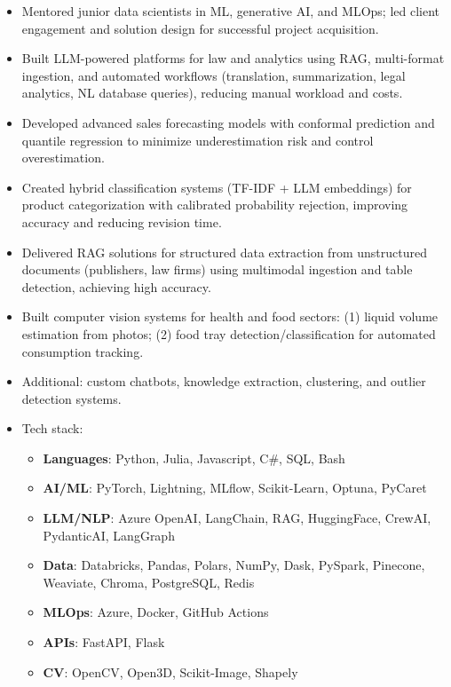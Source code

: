
{\small
{}
\begin{itemize}
    \item Mentored junior data scientists in ML, generative AI, and MLOps; led client engagement and solution design for successful project acquisition.
    \item Built LLM-powered platforms for law and analytics using RAG, multi-format ingestion, and automated workflows (translation, summarization, legal analytics, NL database queries), reducing manual workload and costs.
    \item Developed advanced sales forecasting models with conformal prediction and quantile regression to minimize underestimation risk and control overestimation.
    \item Created hybrid classification systems (TF-IDF + LLM embeddings) for product categorization with calibrated probability rejection, improving accuracy and reducing revision time.
    \item Delivered RAG solutions for structured data extraction from unstructured documents (publishers, law firms) using multimodal ingestion and table detection, achieving high accuracy.
    \item Built computer vision systems for health and food sectors: (1) liquid volume estimation from photos; (2) food tray detection/classification for automated consumption tracking.
    \item Additional: custom chatbots, knowledge extraction, clustering, and outlier detection systems.
    \item Tech stack:
    \begin{itemize}
        \item \textbf{Languages}: {\color{accent2}Python, Julia, Javascript, C\#, SQL, Bash}
        \item \textbf{AI/ML}: {\color{accent2}PyTorch, Lightning, MLflow, Scikit-Learn, Optuna, PyCaret}
        \item \textbf{LLM/NLP}: {\color{accent2}Azure OpenAI, LangChain, RAG, HuggingFace, CrewAI, PydanticAI, LangGraph}
        \item \textbf{Data}: {\color{accent2}Databricks, Pandas, Polars, NumPy, Dask, PySpark, Pinecone, Weaviate, Chroma, PostgreSQL, Redis}
        \item \textbf{MLOps}: {\color{accent2}Azure, Docker, GitHub Actions}
        \item \textbf{APIs}: {\color{accent2}FastAPI, Flask}
        \item \textbf{CV}: {\color{accent2}OpenCV, Open3D, Scikit-Image, Shapely}
    \end{itemize}
\end{itemize}

}
